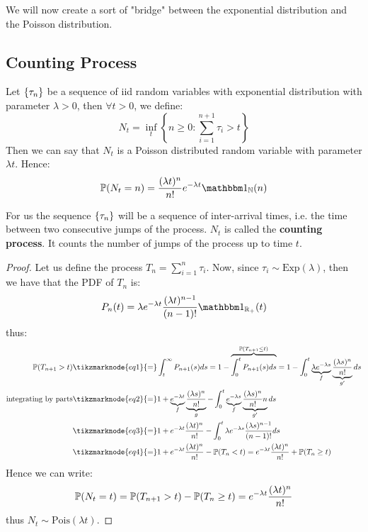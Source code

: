 We will now create a sort of "bridge" between the exponential distribution and
the Poisson distribution.

\subsection*{Counting Process}

\begin{theorem}
    Let $\seq{\tau}$ be a sequence of iid random variables with exponential
    distribution with parameter $\lambda > 0$, then $\forall t > 0$, we define:
    \[
        N_t = \inf_t \left\{ n\geq 0 : \sum^{n+1}_{i=1} \tau_i > t \right\}
    \]
    Then we can say that $N_t$ is a Poisson distributed random variable with
    parameter $\lambda t$. Hence:
    \[
        \P(N_t = n) = \frac{(\lambda t)^n}{n!} e^{-\lambda t} \I_{\N}(n)
    \]
\end{theorem}

\begin{remark}
    For us the sequence $\seq{\tau}$ will be a sequence of inter-arrival times,
    i.e. the time between two consecutive jumps of the process.
    $N_t$ is called the \textbf{counting process}. It counts the number of jumps
    of the process up to time $t$.
\end{remark}

\begin{proof}
    Let us define the process $T_n = \sum^n_{i=1} \tau_i$. Now, since 
    $\tau_i\sim \text{Exp}(\lambda)$, then we have that the PDF of $T_n$ is:
    \[
        P_n(t) = \lambda e^{-\lambda t} \frac{(\lambda t)^{n-1}}{(n-1)!}
        \I_{\Rpos}(t)
    \]
    thus:
    \begin{align*}
        \P(T_{n+1}>t) & \tikzmarknode{eq1}{=} \int_t^\infty P_{n+1}(s) ds
            = 1 - \overbrace{\int_0^t P_{n+1}(s) ds}^{\P(T_{n+1}\leq t)} 
            = 1 - \int_0^t \underbrace{\lambda e^{-\lambda s}}_f
            \underbrace{\frac{(\lambda s)^n}{n!}}_{g'} ds \\
        \text{integrating by parts} & \tikzmarknode{eq2}{=} 1 + 
            \underbrace{e^{-\lambda t}}_f\underbrace{\frac{(\lambda s)^n}{n!}}_g
            - \int_0^t \underbrace{e^{-\lambda s}}_f
            \underbrace{\frac{(\lambda s)^n}{n!}n}_{g'} ds \\
        & \tikzmarknode{eq3}{=} 1 + e^{-\lambda t} \frac{(\lambda t)^n}{n!} -
            \int_0^t \lambda e^{-\lambda s} \frac{(\lambda s)^{n-1}}{(n-1)!} ds \\
        & \tikzmarknode{eq4}{=} 1 + e^{-\lambda t} \frac{(\lambda t)^n}{n!} -
            \P(T_n < t) = e^{-\lambda t} \frac{(\lambda t)^n}{n!} + 
            \P(T_n \geq t)
    \end{align*} 
    Hence we can write:
    \[
        \P(N_t = t) = \P(T_{n+1}>t) - \P(T_n \geq t) = e^{-\lambda t}
        \frac{(\lambda t)^n}{n!} 
    \] 
    thus $N_t\sim\text{Pois}(\lambda t)$.
\end{proof}

